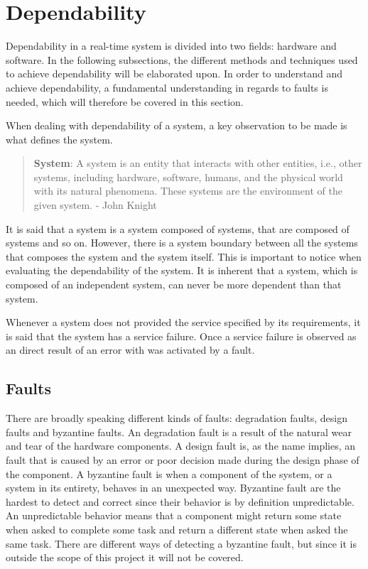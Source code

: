 \section{Dependability}
Dependability in a real-time system is divided into two fields: hardware and software. 
In the following subsections, the different methods and techniques used to achieve dependability will be elaborated upon.  
In order to understand and achieve dependability, a fundamental understanding in regards to faults is needed, which will therefore be covered in this section.

When dealing with dependability of a system, a key observation to be made is what defines the system. 
\begin{quote}
\textbf{System}: A system is an entity that interacts with other entities, i.e., other systems, including hardware, software, humans, and the physical world with its natural phenomena.
These systems are the environment of the given system. 
- John Knight \cite{FundementalsOfDependableComputingForSoftwareEngineers}
\end{quote}
It is said that a system is a system composed of systems, that are composed of systems and so on. 
However, there is a system boundary between all the systems that composes the system and the system itself. 
This is important to notice when evaluating the dependability of the system. 
It is inherent that a system, which is composed of an independent system, can never be more dependent than that system. 

Whenever a system does not provided the service specified by its requirements, it is said that the system has a service failure. 
Once a service failure is observed as an direct result of an error with was activated by a fault. 

\subsection{Faults}
There are broadly speaking different kinds of faults: degradation faults, design faults and byzantine faults. 
An degradation fault is a result of the natural wear and tear of the hardware components.
A design fault is, as the name implies, an fault that is caused by an error or poor decision made during the design phase of the component. 
A byzantine fault is when a component of the system, or a system in its entirety, behaves in an unexpected way. 
Byzantine fault are the hardest to detect and correct since their behavior is by definition unpredictable. 
An unpredictable behavior means that a component might return some state when asked to complete some task and return a different state when asked the same task. 
There are different ways of detecting a byzantine fault, but since it is outside the scope of this project it will not be covered. 

